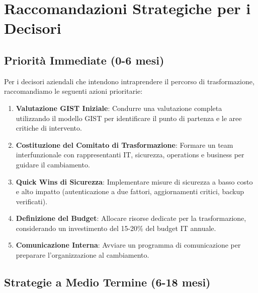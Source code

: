 \section{Raccomandazioni Strategiche per i Decisori}
\label{sec:5.7}

\subsection{Priorità Immediate (0-6 mesi)}
\label{subsec:5.7.1}

Per i decisori aziendali che intendono intraprendere il percorso di trasformazione, raccomandiamo le seguenti azioni prioritarie:

\begin{tcolorbox}[
    colback=red!5!white,
    colframe=red!75!black,
    title={\textbf{Azioni Critiche Immediate}},
    fonttitle=\bfseries
]

\begin{enumerate}
\item \textbf{Valutazione GIST Iniziale}: Condurre una valutazione completa utilizzando il modello GIST per identificare il punto di partenza e le aree critiche di intervento.

\item \textbf{Costituzione del Comitato di Trasformazione}: Formare un team interfunzionale con rappresentanti IT, sicurezza, operations e business per guidare il cambiamento.

\item \textbf{Quick Wins di Sicurezza}: Implementare misure di sicurezza a basso costo e alto impatto (autenticazione a due fattori, aggiornamenti critici, backup verificati).

\item \textbf{Definizione del Budget}: Allocare risorse dedicate per la trasformazione, considerando un investimento del 15-20\% del budget IT annuale.

\item \textbf{Comunicazione Interna}: Avviare un programma di comunicazione per preparare l'organizzazione al cambiamento.
\end{enumerate}

\end{tcolorbox}

\subsection{Strategie a Medio Termine (6-18 mesi)}
\label{subsec:5.7.2}

